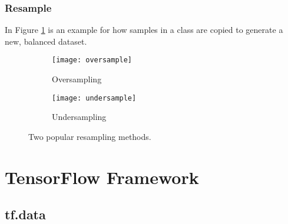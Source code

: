 \documentclass[thesis.tex]{subfiles}
\begin{document}
\subsubsection{Resample}
In Figure \ref{fig:oversample} is an example for how samples in a class are copied to generate a new, balanced dataset.

\begin{figure} %
  \centering
  \begin{subfigure}[b]{0.4\linewidth}
    \centering
    \texttt{[image: oversample]}
    \caption{Oversampling}
    \label{fig:oversample}
  \end{subfigure}
  \quad
  \begin{subfigure}[b]{0.4\linewidth}
    \centering
    \texttt{[image: undersample]}
    \caption{Undersampling}
    \label{fig:undersample}
  \end{subfigure}
  \caption[Two popular resampling methods]{Two popular resampling methods.}
  \label{fig:resampling}
\end{figure}


\section{TensorFlow Framework} 


\subsection{tf.data} %




\end{document}
